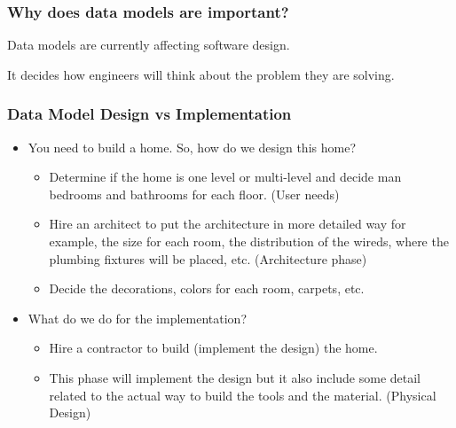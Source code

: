 
\begin{frame}
\frametitle{Why does data models are important?}
\begin{wideitemize}	
\item Data models are currently affecting software design. 
\item It decides how engineers will think about the problem they are solving.
\end{wideitemize}
\end{frame}

\begin{frame}
\frametitle{Data Model Design vs Implementation}
	\begin{itemize}[<+->]
	\item You need to build a home. So, how do we design this home?
		\begin{itemize}[<+->]
		\item Determine if the home is one level or multi-level and decide man bedrooms and bathrooms for each floor. (User needs)
		\item Hire an architect to put the architecture in more detailed way for example, the size for each room, the distribution of the wireds, where the plumbing fixtures will be placed, etc. (Architecture phase)
		\item Decide the decorations, colors for each room, carpets, etc. 
		\end{itemize}
	\item What do we do for the implementation?
		\begin{itemize}[<+->]
		\item Hire a contractor to build (implement the design) the home. 
		\item This phase will implement the design but it also include some detail related to the actual way to build the tools and the material. (Physical Design)
		\end{itemize}		
	\end{itemize}
\end{frame}


